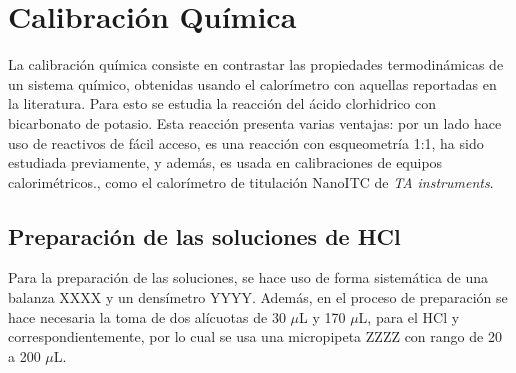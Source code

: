 
%




\chapter{Calibraci\'on Qu\'imica}
	La calibraci\'on qu\'imica consiste en contrastar las propiedades termodin\'amicas de un sistema qu\'imico, obtenidas usando el calor\'imetro con aquellas reportadas en la literatura. Para esto se estudia la reacci\'on del \'acido clorhidrico con bicarbonato de potasio. Esta reacci\'on presenta varias ventajas: por un lado hace uso de reactivos de f\'acil acceso, es una reacci\'on con esqueometr\'ia 1:1, ha sido estudiada previamente, y adem\'as, es usada en calibraciones de equipos calorim\'etricos., como el calor\'imetro de titulaci\'on NanoITC de \textit{TA instruments}.
	
\section{Preparaci\'on de las soluciones de HCl}\label{sec: soluciones}
	Para la preparaci\'on de las soluciones, se hace uso de forma sistem\'atica de una balanza XXXX y un dens\'imetro YYYY. Adem\'as, en el proceso de preparaci\'on se hace necesaria la toma de dos al\'icuotas de 30 $\mu$L y 170 $\mu$L, para el HCl y  correspondientemente, por lo cual se usa una micropipeta ZZZZ con rango de 20 a 200 $\mu$L.
